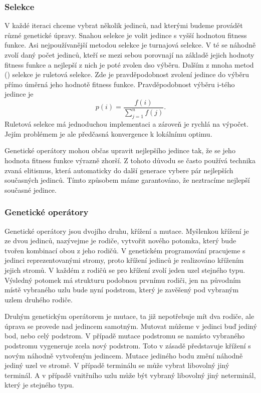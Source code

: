 \subsubsection{Selekce}
V každé iteraci chceme vybrat několik jedinců, nad kterými budeme provádět různé genetické úpravy. Snahou selekce je volit jedince s vyšší hodnotou fitness funkce.
Asi nejpoužívanější metodou selekce je turnajová selekce. V té se náhodně zvolí daný počet jedinců, kteří se mezi sebou porovnají na základě jejich hodnoty fitness funkce a nejlepší z nich je poté zvolen dso výběru.
Dalším z mnoha metod (\cite{selekcniMetody}) selekce je ruletová selekce. Zde je pravděpodobnost zvolení jedince do výběru přímo úměrná jeho hodnotě fitness funkce.
Pravděpodobnost výběru i-tého jedince je 
\[p(i) = \frac{f(i)}{\sum_{j=1}^{n} f(j)}. \]
Ruletová selekce má jednoduchou implementaci a zároveň je rychlá na výpočet. 
Jejím problémem je ale předčasná konvergence k lokálnímu optimu.
\par
Genetické operátory mohou občas upravit nejlepšího jedince tak, že se jeho hodnota fitness funkce výrazně zhorší.
Z tohoto důvodu se často používá technika zvaná elitismus, která automaticky do další generace vybere pár nejlepších současných jedinců. 
Tímto způsobem máme garantováno, že neztracíme nejlepší současné jedince.



\subsubsection{Genetické operátory}
Genetické operátory jsou dvojího druhu, křížení a mutace. Myšlenkou křížení je ze dvou jedinců, nazývejme je rodiče, vytvořit nového potomka, který bude tvořen kombinací obou z jeho rodičů.
V genetickém programování pracujeme s jedinci reprezentovanými stromy, proto křížení jedinců je realizováno křížením jejich stromů. V každém z rodičů se pro křížení zvolí jeden uzel stejného typu. 
Výsledný potomek má strukturu podobnou prvnímu rodiči, jen na původním místě vybraného uzlu bude nyní podstrom, který je zavěšený pod vybraným uzlem druhého rodiče.
\par
Druhým genetickým operátorem je mutace, ta již nepotřebuje mít dva rodiče, ale úprava se provede nad jedincem samotným.
Mutovat můžeme v jedinci buď jediný bod, nebo celý podstrom. V případě mutace podstromu se namísto vybraného podstromu vygeneruje zcela nový podstrom. 
Toto v zásadě představuje křížení s novým náhodně vytvořeným jedincem.
\newline
Mutace jediného bodu změní náhodně jediný uzel ve stromě. V případě terminálu se může vybrat libovolný jiný terminál. A v případě vnitřního uzlu může být vybraný libovolný jiný neterminál, který je stejného typu.


